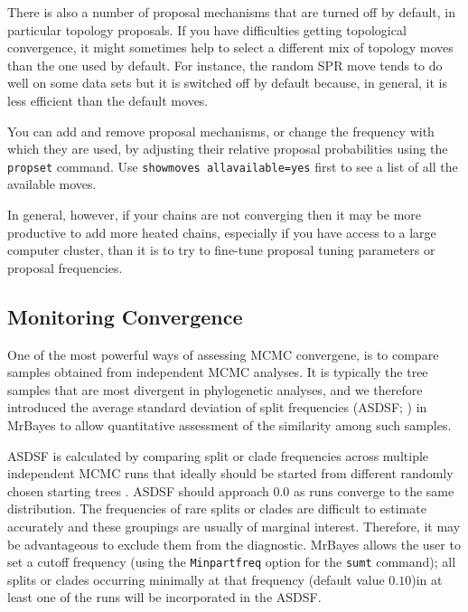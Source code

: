 \documentclass[12pt]{book}
\newcommand{\ttt}[1]{\texttt{#1}}
\begin{document}
There is also a number of proposal mechanisms that are turned off by default, in particular
topology proposals. If you have difficulties getting topological convergence, it might sometimes
help to select a different mix of topology moves than the one used by default. For instance, the
random SPR move tends to do well on some data sets but it is switched off by default because, in
general, it is less efficient than the default moves.

You can add and remove proposal mechanisms, or change the frequency with which they are used, by
adjusting their relative proposal probabilities using the \ttt{propset} command. Use
\ttt{showmoves allavailable=yes} first to see a list of all the available moves.

In general, however, if your chains are not converging then it may be more productive to add more
heated chains, especially if you have access to a large computer cluster, than it is to try to
fine-tune proposal tuning parameters or proposal frequencies.



\subsection{Monitoring Convergence}
\label{monitoringConvergence}
One of the most powerful ways of assessing MCMC convergene, is to compare samples obtained from
independent MCMC analyses. It is typically the tree samples that are most divergent in phylogenetic
analyses, and we therefore introduced the average standard deviation of split frequencies (ASDSF;
\citep{lakner08}) in MrBayes to allow quantitative assessment of the similarity among such samples.

ASDSF is calculated by comparing split or clade frequencies across multiple independent MCMC runs
that ideally should be started from different randomly chosen starting trees \citep{lakner08}.
ASDSF should approach $0.0$ as runs converge to the same distribution. The frequencies of rare
splits or clades are difficult to estimate accurately and these groupings are usually of marginal
interest. Therefore, it may be advantageous to exclude them from the diagnostic. MrBayes allows the
user to set a cutoff frequency (using the \ttt{Minpartfreq} option for the \ttt{sumt} command); all
splits or clades occurring minimally at that frequency (default value $0.10$)in at least one of the
runs will be incorporated in the ASDSF.
\end{document}
